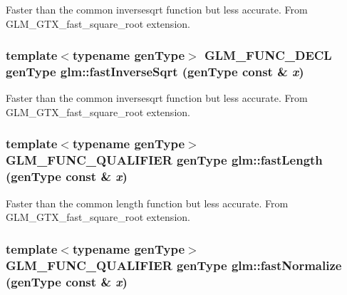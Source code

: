 Faster than the common inversesqrt function but less accurate. From GLM\_\-GTX\_\-fast\_\-square\_\-root extension. \hypertarget{group__gtx__fast__square__root_g38b3acc3e6a37b2e6f78e2bb29585047}{
\subsubsection[fastInverseSqrt]{\setlength{\rightskip}{0pt plus 5cm}template$<$typename genType$>$ GLM\_\-FUNC\_\-DECL genType glm::fastInverseSqrt (genType const \& {\em x})}}
\label{group__gtx__fast__square__root_g38b3acc3e6a37b2e6f78e2bb29585047}


Faster than the common inversesqrt function but less accurate. From GLM\_\-GTX\_\-fast\_\-square\_\-root extension. \hypertarget{group__gtx__fast__square__root_g49395da3932ad3f2b33d6b874aa1de0d}{
\subsubsection[fastLength]{\setlength{\rightskip}{0pt plus 5cm}template$<$typename genType$>$ GLM\_\-FUNC\_\-QUALIFIER genType glm::fastLength (genType const \& {\em x})}}
\label{group__gtx__fast__square__root_g49395da3932ad3f2b33d6b874aa1de0d}


Faster than the common length function but less accurate. From GLM\_\-GTX\_\-fast\_\-square\_\-root extension. \hypertarget{group__gtx__fast__square__root_g06fee9a90e853107e9d70d690dccf478}{
\subsubsection[fastNormalize]{\setlength{\rightskip}{0pt plus 5cm}template$<$typename genType$>$ GLM\_\-FUNC\_\-QUALIFIER genType glm::fastNormalize (genType const \& {\em x})}}
\label{group__gtx__fast__square__root_g06fee9a90e853107e9d70d690dccf478}


